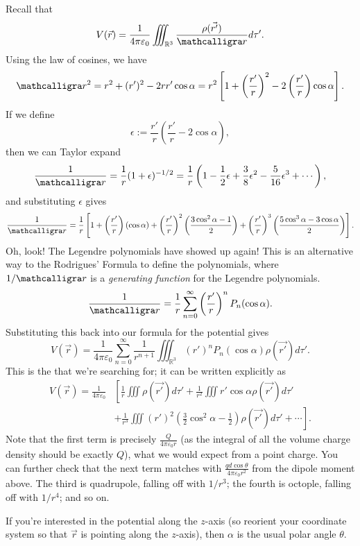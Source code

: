 Recall that
\[V(\vec{r})=\frac{1}{4\pi\varepsilon_0}\iiint_{\mathbb{R}^3}\frac{\rho(\vec{r'})}{\scr}d\tau'.\]
Using the law of cosines, we have
\[\scr^2=r^2+(r')^2-2rr'\cos\alpha=r^2\left[1+\left(\frac{r'}{r}\right)^2-2\left(\frac{r'}{r}\right)\cos\alpha\right].\]
If we define 
\[\epsilon:=\frac{r'}{r}\left(\frac{r'}{r}-2\cos\alpha\right),\]
then we can Taylor expand
\[\frac{1}{\scr}=\frac{1}{r}(1+\epsilon)^{-1/2}=\frac{1}{r}\left(1-\frac{1}{2}\epsilon+\frac{3}{8}\epsilon^2-\frac{5}{16}\epsilon^3+\cdots\right),\]
and substituting $\epsilon$ gives
\[\frac{1}{\scr}=\frac{1}{r}\left[1+\left(\frac{r'}{r}\right)(\cos\alpha)+\left(\frac{r'}{r}\right)^2\left(\frac{3\cos^2\alpha-1}{2}\right)+\left(\frac{r'}{r}\right)^3\left(\frac{5\cos^3\alpha-3\cos\alpha}{2}\right)\right].\]
Oh, look! The Legendre polynomials have showed up again! This is an alternative way to the Rodrigues' Formula to define the polynomials, where $1/\scr$ is a \textit{generating function} for the Legendre polynomials.
\[\frac{1}{\scr}=\frac{1}{r}\sum_{n=0}^\infty \left(\frac{r'}{r}\right)^nP_n(\cos\alpha).\]
Substituting this back into our formula for the potential gives
\[\boxed{V(\vec{r})=\frac{1}{4\pi\varepsilon_0}\sum_{n=0}^\infty \frac{1}{r^{n+1}}\iiint_{\mathbb{R}^3}(r')^nP_n(\cos\alpha)\rho(\vec{r'})d\tau'}.\]
This is the  that we're searching for; it can be written explicitly as
\begin{align*}
V(\vec{r})=\frac{1}{4\pi\varepsilon_0}&\left[\frac{1}{r}\iiint \rho(\vec{r'})d\tau'+\frac{1}{r^2}\iiint r'\cos\alpha \rho(\vec{r'})d\tau'\right.\\
&\left.+\frac{1}{r^3}\iiint(r')^2\left(\frac{3}{2}\cos^2\alpha-\frac{1}{2}\right)\rho(\vec{r'})d\tau'+\cdots\right].
\end{align*}
Note that the first term is precisely $\frac{Q}{4\pi\varepsilon_0r}$ (as the integral of all the volume charge density should be exactly $Q$), what we would expect from a point charge. You can further check that the next term matches with $\frac{qd\cos\theta}{4\pi\varepsilon_0r^2}$ from the dipole moment above. The third is quadrupole, falling off with $1/r^3$; the fourth is octople, falling off with $1/r^4$; and so on.

\begin{remark}
If you're interested in the potential along the $z$-axis (so reorient your coordinate system so that $\vec{r}$ is pointing along the $z$-axis), then $\alpha$ is the usual polar angle $\theta$. 
\end{remark}

